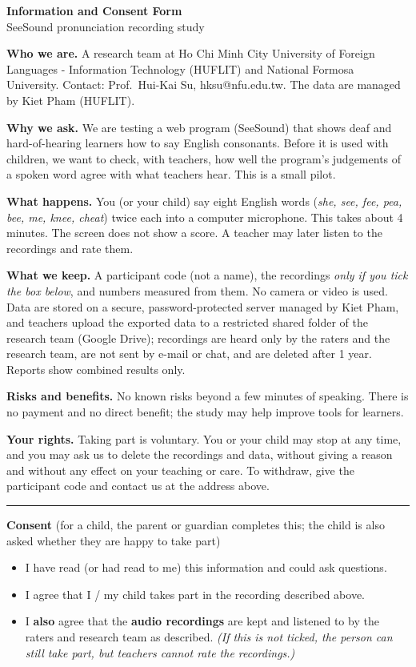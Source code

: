 \documentclass[11pt,a4paper]{article}
\begin{document}
\begin{center}{\Large\bfseries Information and Consent Form}\\[2pt]
SeeSound pronunciation recording study\end{center}

\textbf{Who we are.} A research team at Ho Chi Minh City University of Foreign Languages - Information Technology (HUFLIT) and National Formosa University. Contact: Prof.\ Hui-Kai Su, hksu@nfu.edu.tw. The data are managed by Kiet Pham (HUFLIT).

\textbf{Why we ask.} We are testing a web program (SeeSound) that shows deaf and hard-of-hearing learners how to say English consonants. Before it is used with children, we want to check, with teachers, how well the program's judgements of a spoken word agree with what teachers hear. This is a small pilot.

\textbf{What happens.} You (or your child) say eight English words (\textit{she, see, fee, pea, bee, me, knee, cheat}) twice each into a computer microphone. This takes about 4 minutes. The screen does not show a score. A teacher may later listen to the recordings and rate them.

\textbf{What we keep.} A participant code (not a name), the recordings \emph{only if you tick the box below}, and numbers measured from them. No camera or video is used. Data are stored on a secure, password-protected server managed by Kiet Pham, and teachers upload the exported data to a restricted shared folder of the research team (Google Drive); recordings are heard only by the raters and the research team, are not sent by e-mail or chat, and are deleted after 1 year. Reports show combined results only.

\textbf{Risks and benefits.} No known risks beyond a few minutes of speaking. There is no payment and no direct benefit; the study may help improve tools for learners.

\textbf{Your rights.} Taking part is voluntary. You or your child may stop at any time, and you may ask us to delete the recordings and data, without giving a reason and without any effect on your teaching or care. To withdraw, give the participant code and contact us at the address above.

\medskip\hrule\medskip
\textbf{Consent} (for a child, the parent or guardian completes this; the child is also asked whether they are happy to take part)

\begin{itemize}[label=$\square$]
\item I have read (or had read to me) this information and could ask questions.
\item I agree that I / my child takes part in the recording described above.
\item I \textbf{also} agree that the \textbf{audio recordings} are kept and listened to by the raters and research team as described. \textit{(If this is not ticked, the person can still take part, but teachers cannot rate the recordings.)}
\end{itemize}
\end{document}

